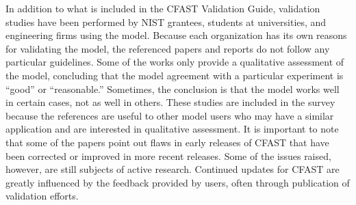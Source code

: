 In addition to what is included in the CFAST Validation Guide, validation studies have been performed by NIST grantees, students at universities, and engineering firms using the model.  Because each organization has its  own reasons for  validating the model, the  referenced papers and reports do not follow any particular guidelines. Some of the works only provide  a qualitative assessment  of the model,  concluding that the  model  agreement with  a  particular  experiment  is ``good''  or ``reasonable.'' Sometimes, the conclusion is that the model works well in certain cases, not as well in others. These studies are included in the survey because the references  are useful to other model users who may have a similar application  and are interested in qualitative assessment. It is important to note  that some of the papers point out flaws in early releases of CFAST that have been corrected or improved in more recent  releases. Some of  the issues raised, however,  are still subjects of  active research. Continued updates for CFAST  are greatly influenced  by   the  feedback   provided  by  users,   often  through publication of validation efforts.



